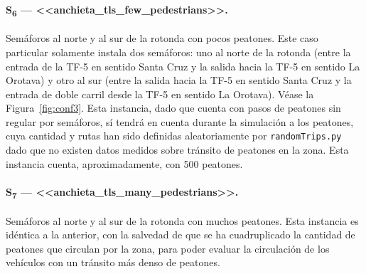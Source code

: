 \paragraph{S\textsubscript{6} --- <<anchieta\_tls\_few\_pedestrians>>.} Semáforos al norte y al sur de la rotonda con pocos peatones. Este caso particular solamente instala dos semáforos: uno al norte de la rotonda (entre la entrada de la TF-5 en sentido Santa Cruz y la salida hacia la TF-5 en sentido La Orotava) y otro al sur (entre la salida hacia la TF-5 en sentido Santa Cruz y la entrada de doble carril desde la TF-5 en sentido La Orotava). Véase la Figura~\ref{fig:conf3}. Esta instancia, dado que cuenta con pasos de peatones sin regular por semáforos, sí tendrá en cuenta durante la simulación a los peatones, cuya cantidad y rutas han sido definidas aleatoriamente por \texttt{randomTrips.py} dado que no existen datos medidos sobre tránsito de peatones en la zona. Esta instancia cuenta, aproximadamente, con 500 peatones.

\paragraph{S\textsubscript{7} --- <<anchieta\_tls\_many\_pedestrians>>.} Semáforos al norte y al sur de la rotonda con muchos peatones. Esta instancia es idéntica a la anterior, con la salvedad de que se ha cuadruplicado la cantidad de peatones que circulan por la zona, para poder evaluar la circulación de los vehículos con un tránsito más denso de peatones.


